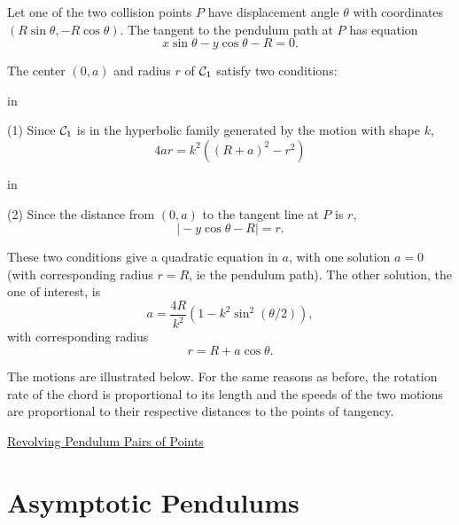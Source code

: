 \documentclass{ximera}
\newcommand{\pskip}{\vskip 0.1 in}
\begin{document}
Let one of the two collision points $P$ have displacement angle $\theta$ with coordinates $(R\sin\theta, -R \cos\theta)$. The tangent to the pendulum path at $P$ has equation
\[
       x\sin \theta - y\cos\theta - R = 0.
\]

The center $(0,a)$ and radius $r$ of ${\cal C}_1$ satisfy two conditions:

\pskip

(1) Since ${\cal C}_1$ is in the hyperbolic family generated by the motion with shape $k$,
\[
      4ar = k^2 \left(  (R+a)^2 - r^2   \right)
\]

\pskip

(2) Since the distance from $(0,a)$ to the tangent line at $P$ is $r$, 
\[
     \Big|  -y \cos \theta - R  \Big| = r .
\] 

These two conditions give a quadratic equation in $a$, with one solution $a=0$ (with corresponding radius $r=R$, ie the pendulum path). The other solution, the one of interest, is
\[
     a = \frac{4R}{k^2} \left( 1 - k^2 \sin^2 (\theta/2)    \right) ,
\]
with corresponding radius
\[
  r = R + a\cos \theta .
\]

The motions are illustrated below. For the same reasons as before, the rotation rate of the chord is proportional to its length and the speeds of the two motions are proportional to their respective distances to the points of tangency.

\begin{onlineOnly}
    \begin{center}
\end{center}
\end{onlineOnly}

\href{https://www.desmos.com/calculator/5vecnkcwou}{Revolving Pendulum Pairs of Points}


\section*{Asymptotic Pendulums}
\end{document}
